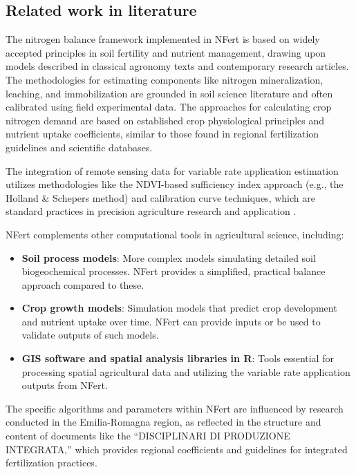 \documentclass[
  11pt,
]{article}
\begin{document}
\subsection{Related work in
literature}\label{related-work-in-literature}

The nitrogen balance framework implemented in NFert is based on widely
accepted principles in soil fertility and nutrient management, drawing
upon models described in classical agronomy texts and contemporary
research articles. The methodologies for estimating components like
nitrogen mineralization, leaching, and immobilization are grounded in
soil science literature and often calibrated using field experimental
data. The approaches for calculating crop nitrogen demand are based on
established crop physiological principles and nutrient uptake
coefficients, similar to those found in regional fertilization
guidelines and scientific databases.

The integration of remote sensing data for variable rate application
estimation utilizes methodologies like the NDVI-based sufficiency index
approach (e.g., the Holland \& Schepers method) and calibration curve
techniques, which are standard practices in precision agriculture
research and application \citet{Holland2009} \citet{Schepers1996}.

NFert complements other computational tools in agricultural science,
including:

\begin{itemize}
\item
  \textbf{Soil process models}: More complex models simulating detailed
  soil biogeochemical processes. NFert provides a simplified, practical
  balance approach compared to these.
\item
  \textbf{Crop growth models}: Simulation models that predict crop
  development and nutrient uptake over time. NFert can provide inputs or
  be used to validate outputs of such models.
\item
  \textbf{GIS software and spatial analysis libraries in R}: Tools
  essential for processing spatial agricultural data and utilizing the
  variable rate application outputs from NFert.
\end{itemize}

The specific algorithms and parameters within NFert are influenced by
research conducted in the Emilia-Romagna region, as reflected in the
structure and content of documents like the ``DISCIPLINARI DI PRODUZIONE
INTEGRATA,'' which provides regional coefficients and guidelines for
integrated fertilization practices.
\end{document}
